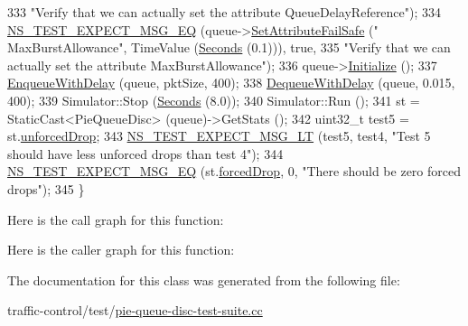 \begin{DoxyCode}
333                          \textcolor{stringliteral}{"Verify that we can actually set the attribute QueueDelayReference"});
334   \hyperlink{group__testing_ga7304ba46a28d8cf08dfdfd6499cf7068}{NS\_TEST\_EXPECT\_MSG\_EQ} (queue->\hyperlink{classns3_1_1ObjectBase_aa7d333004e970f925a4ed5df275541b5}{SetAttributeFailSafe} (\textcolor{stringliteral}{"
      MaxBurstAllowance"}, TimeValue (\hyperlink{group__timecivil_ga33c34b816f8ff6628e33d5c8e9713b9e}{Seconds} (0.1))), \textcolor{keyword}{true},
335                          \textcolor{stringliteral}{"Verify that we can actually set the attribute MaxBurstAllowance"});
336   queue->\hyperlink{classns3_1_1Object_af4411cb29971772fcd09203474a95078}{Initialize} ();
337   \hyperlink{classPieQueueDiscTestCase_a6d837dbfe3af8f4a7a1ca4e6ecbbf54e}{EnqueueWithDelay} (queue, pktSize, 400);
338   \hyperlink{classPieQueueDiscTestCase_ac95d22c3ac6ef3a873d70a663fd964e3}{DequeueWithDelay} (queue, 0.015, 400);
339   Simulator::Stop (\hyperlink{group__timecivil_ga33c34b816f8ff6628e33d5c8e9713b9e}{Seconds} (8.0));
340   Simulator::Run ();
341   st = StaticCast<PieQueueDisc> (queue)->GetStats ();
342   uint32\_t test5 = st.\hyperlink{structns3_1_1PieQueueDisc_1_1Stats_afe4c9f6e4c910cf47d475ff5d29d5bb0}{unforcedDrop};
343   \hyperlink{group__testing_ga5e7f81b9d00df9c727e6281e1b1bbc55}{NS\_TEST\_EXPECT\_MSG\_LT} (test5, test4, \textcolor{stringliteral}{"Test 5 should have less unforced drops than
       test 4"});
344   \hyperlink{group__testing_ga7304ba46a28d8cf08dfdfd6499cf7068}{NS\_TEST\_EXPECT\_MSG\_EQ} (st.\hyperlink{structns3_1_1PieQueueDisc_1_1Stats_a40eea66d9bc2ce766df9390776eb88a9}{forcedDrop}, 0, \textcolor{stringliteral}{"There should be zero forced
       drops"});
345 \}
\end{DoxyCode}


Here is the call graph for this function\+:




Here is the caller graph for this function\+:




The documentation for this class was generated from the following file\+:\begin{DoxyCompactItemize}
\item 
traffic-\/control/test/\hyperlink{pie-queue-disc-test-suite_8cc}{pie-\/queue-\/disc-\/test-\/suite.\+cc}\end{DoxyCompactItemize}
